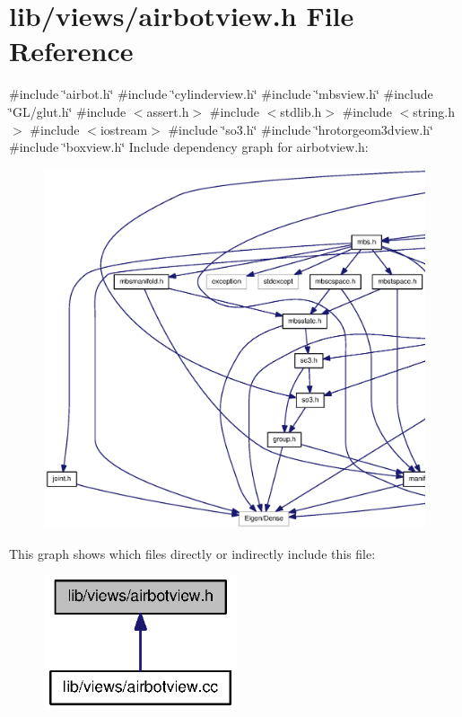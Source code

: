 \section{lib/views/airbotview.h \-File \-Reference}
\label{airbotview_8h}
{\ttfamily \#include \char`\"{}airbot.\-h\char`\"{}}\*
{\ttfamily \#include \char`\"{}cylinderview.\-h\char`\"{}}\*
{\ttfamily \#include \char`\"{}mbsview.\-h\char`\"{}}\*
{\ttfamily \#include \char`\"{}\-G\-L/glut.\-h\char`\"{}}\*
{\ttfamily \#include $<$assert.\-h$>$}\*
{\ttfamily \#include $<$stdlib.\-h$>$}\*
{\ttfamily \#include $<$string.\-h$>$}\*
{\ttfamily \#include $<$iostream$>$}\*
{\ttfamily \#include \char`\"{}so3.\-h\char`\"{}}\*
{\ttfamily \#include \char`\"{}hrotorgeom3dview.\-h\char`\"{}}\*
{\ttfamily \#include \char`\"{}boxview.\-h\char`\"{}}\*
\-Include dependency graph for airbotview.\-h\-:
\nopagebreak
\begin{figure}[H]
\begin{center}
\leavevmode
\includegraphics[width=350pt]{airbotview_8h__incl}
\end{center}
\end{figure}
\-This graph shows which files directly or indirectly include this file\-:
\nopagebreak
\begin{figure}[H]
\begin{center}
\leavevmode
\includegraphics[width=160pt]{airbotview_8h__dep__incl}
\end{center}
\end{figure}
